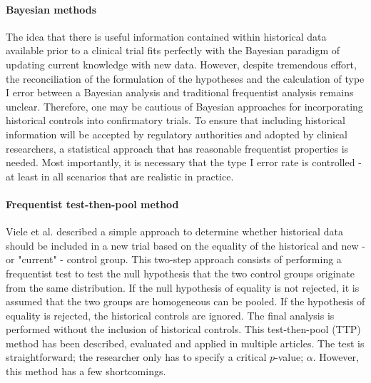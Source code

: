 \documentclass[Royal,sagev,times]{sagej}
\begin{document}
\paragraph{Bayesian methods}
The idea that there is useful information contained within historical data available prior to a clinical trial fits perfectly with the Bayesian paradigm of updating current knowledge with new data.\cite{lim2018} However, despite tremendous effort, the reconciliation of the formulation of the hypotheses and the calculation of type I error between a Bayesian analysis and traditional frequentist analysis remains unclear.\cite{quan2019} Therefore, one may be cautious of Bayesian approaches for incorporating historical controls into confirmatory trials.\cite{lim2018} To ensure that including historical information will be accepted by regulatory authorities and adopted by clinical researchers, a statistical approach that has reasonable frequentist properties is needed.\cite{normington2019} Most importantly, it is necessary that the type I error rate is controlled - at least in all scenarios that are realistic in practice.\cite{Mielke2018}


\paragraph{Frequentist test-then-pool method}
Viele et al. described a simple approach to determine whether historical data should be included in a new trial based on the equality of the historical and new - or "current" - control group. \cite{vRosmalen2018} This two-step approach consists of performing a frequentist test to test the null hypothesis that the two control groups originate from the same distribution.\cite{viele2014} If the null hypothesis of equality is not rejected, it is assumed that the two groups are homogeneous can be pooled. If the hypothesis of equality is rejected, the historical controls are ignored. \cite{viele2014} The final analysis is performed without the inclusion of historical controls. This test-then-pool (TTP) method has been described, evaluated and applied in multiple articles. The test is straightforward; the researcher only has to specify a critical $p$-value; $\alpha$. However, this method has a few shortcomings.
\end{document}
